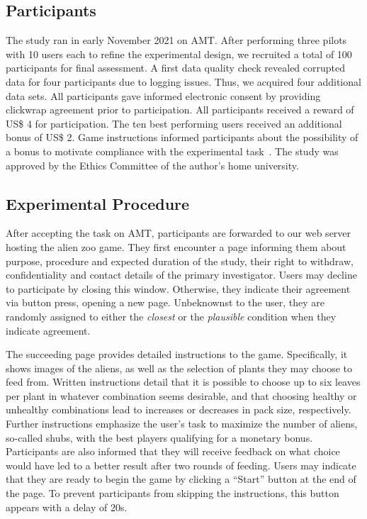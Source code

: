 \subsection{Participants}

The study ran in early November 2021 on \gls{AMT}.
After performing three pilots with 10 users each to refine the experimental design, we recruited a total of 100 participants for final assessment. %
A first data quality check revealed corrupted data for four participants due to logging issues. 
Thus, we acquired four additional data sets. 
All participants gave informed electronic consent by providing clickwrap agreement prior to participation.
All participants received a reward of US\$ 4 for participation. 
The ten best performing users received an additional bonus of US\$ 2. 
Game instructions informed participants about the possibility of a bonus to motivate compliance with the experimental task~\citep{bansal_updates_2019}.
The study was approved by the Ethics Committee of the author's home university.

\subsection{Experimental Procedure}\label{subsec:experimental-procedure}

After accepting the task on \gls{AMT}, participants are forwarded to our web server hosting the alien zoo game.
They first encounter a page informing them about purpose, procedure and expected duration of the study, their right to withdraw, confidentiality and contact details of the primary investigator.
Users may decline to participate by closing this window.
Otherwise, they indicate their agreement via button press, opening a new page.
Unbeknownst to the user, they are randomly assigned to either the \textit{closest} or the \textit{plausible} condition when they indicate agreement.

The succeeding page provides detailed instructions to the game. 
Specifically, it shows images of the aliens, as well as the selection of plants they may choose to feed from.
Written instructions detail that it is possible to choose up to six leaves per plant in whatever combination seems desirable, and that choosing healthy or unhealthy combinations lead to increases or decreases in pack size, respectively.
Further instructions emphasize the user's task to maximize the number of aliens, so-called shubs, with the best players qualifying for a monetary bonus.
Participants are also informed that they will receive feedback on what choice would have led to a better result after two rounds of feeding.
Users may indicate that they are ready to begin the game by clicking a ``Start'' button at the end of the page.
To prevent participants from skipping the instructions, this button appears with a delay of 20s.

